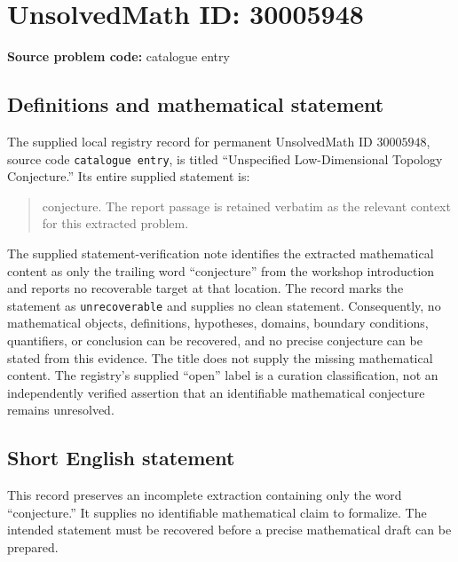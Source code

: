 \documentclass[11pt]{article}
\begin{document}
\section*{UnsolvedMath ID: 30005948}
\textbf{Source problem code:} catalogue entry
\subsection{Definitions and mathematical statement}
The supplied local registry record for permanent UnsolvedMath ID \(30005948\), source code \texttt{catalogue entry}, is titled ``Unspecified Low-Dimensional Topology Conjecture.'' Its entire supplied statement is:
\begin{quote}
conjecture. The report passage is retained verbatim as the relevant context for this extracted problem.
\end{quote}
The supplied statement-verification note identifies the extracted mathematical content as only the trailing word ``conjecture'' from the workshop introduction and reports no recoverable target at that location. The record marks the statement as \texttt{unrecoverable} and supplies no clean statement. Consequently, no mathematical objects, definitions, hypotheses, domains, boundary conditions, quantifiers, or conclusion can be recovered, and no precise conjecture can be stated from this evidence. The title does not supply the missing mathematical content. The registry's supplied ``open'' label is a curation classification, not an independently verified assertion that an identifiable mathematical conjecture remains unresolved.
\subsection{Short English statement}
This record preserves an incomplete extraction containing only the word ``conjecture.'' It supplies no identifiable mathematical claim to formalize. The intended statement must be recovered before a precise mathematical draft can be prepared.
\end{document}
